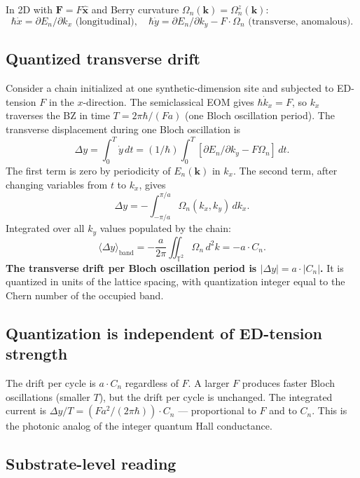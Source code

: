 \documentclass[11pt,a4paper]{article}
\begin{document}
In 2D with $\mathbf{F} = F\hat{\mathbf{x}}$ and Berry curvature $\Omega_n(\mathbf{k}) = \Omega_n^z(\mathbf{k})$:
\[
\hbar\dot x = \partial E_n/\partial k_x \text{ (longitudinal)}, \quad \hbar\dot y = \partial E_n/\partial k_y - F\cdot\Omega_n \text{ (transverse, anomalous)}.
\]

\subsection{Quantized transverse drift}

Consider a chain initialized at one synthetic-dimension site and subjected to ED-tension $F$ in the $x$-direction. The semiclassical EOM gives $\hbar\dot k_x = F$, so $k_x$ traverses the BZ in time $T = 2\pi\hbar/(Fa)$ (one Bloch oscillation period). The transverse displacement during one Bloch oscillation is
\[
\Delta y = \int_0^T \dot y\, dt = (1/\hbar)\int_0^T[\partial E_n/\partial k_y - F\Omega_n]\, dt.
\]
The first term is zero by periodicity of $E_n(\mathbf{k})$ in $k_x$. The second term, after changing variables from $t$ to $k_x$, gives
\[
\Delta y = -\int_{-\pi/a}^{\pi/a}\Omega_n(k_x, k_y)\, dk_x.
\]
Integrated over all $k_y$ values populated by the chain:
\[
\langle\Delta y\rangle_{\mathrm{band}} = -\frac{a}{2\pi}\iint_{\mathbb{T}^2}\Omega_n\, d^2k = -a\cdot C_n.
\]
\textbf{The transverse drift per Bloch oscillation period is $|\Delta y| = a\cdot|C_n|$.} It is quantized in units of the lattice spacing, with quantization integer equal to the Chern number of the occupied band.

\subsection{Quantization is independent of ED-tension strength}

The drift per cycle is $a\cdot C_n$ regardless of $F$. A larger $F$ produces faster Bloch oscillations (smaller $T$), but the drift per cycle is unchanged. The integrated current is $\Delta y/T = (Fa^2/(2\pi\hbar))\cdot C_n$ --- proportional to $F$ and to $C_n$. This is the photonic analog of the integer quantum Hall conductance.

\subsection{Substrate-level reading}
\end{document}
